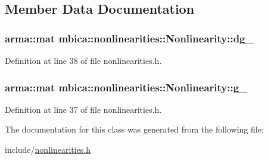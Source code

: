 \subsection{Member Data Documentation}
\hypertarget{classmbica_1_1nonlinearities_1_1_nonlinearity_a7e88146ea0876175cd9834af14aee58a}{
\subsubsection[{dg\_\-}]{\setlength{\rightskip}{0pt plus 5cm}arma::mat {\bf mbica::nonlinearities::Nonlinearity::dg\_\-}}}
\label{classmbica_1_1nonlinearities_1_1_nonlinearity_a7e88146ea0876175cd9834af14aee58a}


Definition at line 38 of file nonlinearities.h.

\hypertarget{classmbica_1_1nonlinearities_1_1_nonlinearity_a11ae531b284349515331e05021a33ea9}{
\subsubsection[{g\_\-}]{\setlength{\rightskip}{0pt plus 5cm}arma::mat {\bf mbica::nonlinearities::Nonlinearity::g\_\-}}}
\label{classmbica_1_1nonlinearities_1_1_nonlinearity_a11ae531b284349515331e05021a33ea9}


Definition at line 37 of file nonlinearities.h.



The documentation for this class was generated from the following file:\begin{DoxyCompactItemize}
\item 
include/\hyperlink{nonlinearities_8h}{nonlinearities.h}\end{DoxyCompactItemize}
